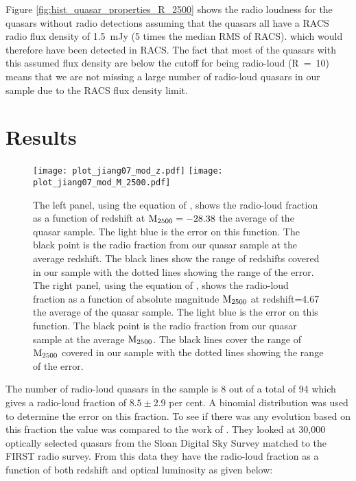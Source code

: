 \documentclass[a4paper,fleqn,usenatbib]{mnras}
\begin{document}
 
{Figure \ref{fig:hist_quasar_properties_R_2500} shows the radio loudness for the quasars without radio detections assuming that the quasars all have a RACS radio flux density of 1.5~mJy (5 times the median RMS of RACS).}  which would therefore  have been detected in RACS.  The fact that most of the quasars with this assumed flux density are below the cutoff for being radio-loud (R~=~10) means that we are not missing a large number of radio-loud quasars in our sample due to the RACS flux density limit. 


\section{Results}
\label{Results}


\begin{figure*}
  \texttt{[image: plot\_jiang07\_mod\_z.pdf]}
  \texttt{[image: plot\_jiang07\_mod\_M\_2500.pdf]}
  \caption{The left panel, using the equation of \citet{jiang07}, shows the radio-loud fraction as a function of redshift at $\rm M_{2500}=-28.38$ the average of the quasar sample.  The light blue is the error on this function.  The black point is the radio fraction from our quasar sample at the average redshift.  The black lines show the range of redshifts covered in our sample with the dotted lines showing the range of the error.
The right panel, using the equation of \citet{jiang07}, shows the radio-loud fraction as a function of absolute magnitude $\rm M_{2500}$ at  redshift=4.67 the average of the quasar sample.  The light blue is the error on this function.  The black point is the radio fraction from our quasar sample at the average $\rm M_{2500}$.  The black lines cover the range of $\rm M_{2500}$ covered in our sample with the dotted lines showing the range of the error.}
  \label{fig:plot_jiang07_mod}
\end{figure*}


The number of radio-loud quasars in the sample is 8 out of a total of 94 which gives a radio-loud fraction of $8.5 \pm 2.9$ per cent.   A binomial distribution was used to determine the error on this fraction.  To see if there was any evolution based on this fraction the value was compared to the work of \citet{jiang07}.  They looked at 30,000 optically selected quasars from the Sloan Digital Sky Survey matched to the FIRST radio survey.  From this data they have the radio-loud fraction as a function of both redshift and optical luminosity as given below:
\end{document}
